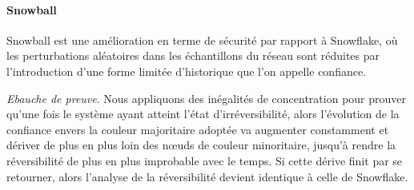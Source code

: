 \documentclass[letterpaper,twocolumn,10pt]{article}
\theoremstyle{definition}
\begin{document}


\paragraph{Snowball}

Snowball est une amélioration en terme de sécurité par rapport à Snowflake, où les perturbations aléatoires dans les
échantillons du réseau sont réduites par l'introduction d'une forme limitée d'historique que l'on appelle confiance.

\noindent \emph{Ebauche de preuve}. Nous appliquons des inégalités de concentration pour prouver qu'une fois le système
ayant atteint l'état d'irréversibilité, alors l'évolution de la confiance envers la couleur majoritaire adoptée va
augmenter constamment et dériver de plus en plus loin des nœuds de couleur minoritaire, jusqu'à rendre la réversibilité
de plus en plus improbable avec le temps. Si cette dérive finit par se retourner, alors l'analyse de la réversibilité
devient identique à celle de Snowflake.
\end{document}
